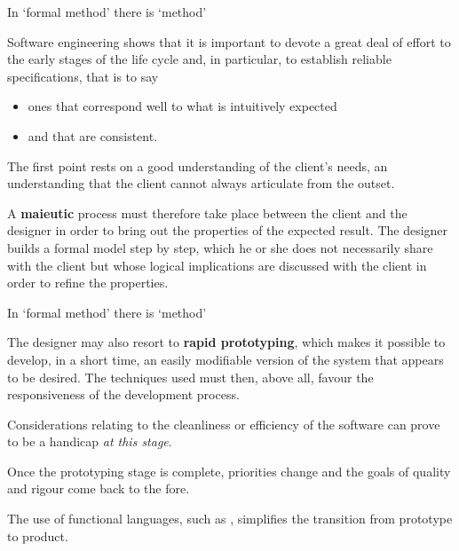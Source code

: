 \documentclass[compress,dvipdfmx]{beamer}
\begin{document}
%
\begin{frame}{In `formal method' there is `method'}

  Software engineering shows that it is important to devote a
  great deal of effort to the early stages of the life cycle and, in
  particular, to establish reliable specifications, that is to say
  \begin{itemize}

    \item ones that correspond well to what is intuitively expected

    \item and that are consistent.

  \end{itemize}

  The first point rests on a good understanding of the client's needs,
  an understanding that the client cannot always articulate from the
  outset.

  \bigskip

  A \textbf{maieutic} process must therefore take place between the
  client and the designer in order to bring out the properties of the
  expected result. The designer builds a formal model step by step,
  which he or she does not necessarily share with the client but whose
  logical implications are discussed with the client in order to
  refine the properties.

\end{frame}

%
\begin{frame}{In `formal method' there is `method'}

  The designer may also resort to \textbf{rapid prototyping}, which
  makes it possible to develop, in a short time, an easily modifiable
  version of the system that appears to be desired. The techniques
  used must then, above all, favour the responsiveness of the
  development process.

  \bigskip

  Considerations relating to the cleanliness or efficiency of the
  software can prove to be a handicap \emph{at this stage}.

  \bigskip

  Once the prototyping stage is complete, priorities change and the
  goals of quality and rigour come back to the fore.

  \bigskip

  The use of functional languages, such as \OCaml, simplifies the
  transition from prototype to product.

\end{frame}
\end{document}
